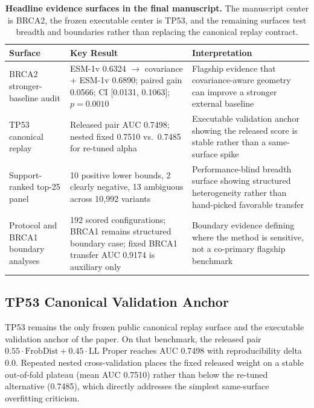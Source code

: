 \documentclass[10pt,twocolumn,letterpaper]{article}
\begin{document}
\begin{table}[t]
\centering
\caption{\textbf{Headline evidence surfaces in the final manuscript.} The manuscript
center is BRCA2, the frozen executable center is TP53, and the remaining surfaces test
breadth and boundaries rather than replacing the canonical replay contract.}
\label{tab:evidence}
\vspace{3pt}
\small
\begin{tabular}{@{}p{}p{}p{}@{}}
\toprule
\textbf{Surface} & \textbf{Key Result} & \textbf{Interpretation} \\
\midrule
BRCA2 stronger-baseline audit &
ESM-1v 0.6324 $\rightarrow$ covariance + ESM-1v 0.6890; paired gain 0.0566; CI [0.0131, 0.1063]; $p=0.0010$ &
Flagship evidence that covariance-aware geometry can improve a stronger external baseline \\
TP53 canonical replay &
Released pair AUC 0.7498; nested fixed 0.7510 vs.\ 0.7485 for re-tuned alpha &
Executable validation anchor showing the released score is stable rather than a same-surface spike \\
Support-ranked top-25 panel &
10 positive lower bounds, 2 clearly negative, 13 ambiguous across 10,992 variants &
Performance-blind breadth surface showing structured heterogeneity rather than hand-picked favorable transfer \\
Protocol and BRCA1 boundary analyses &
192 scored configurations; BRCA1 remains structured boundary case; fixed BRCA1 transfer AUC 0.9174 is auxiliary only &
Boundary evidence defining where the method is sensitive, not a co-primary flagship benchmark \\
\bottomrule
\end{tabular}
\end{table}

\subsection{TP53 Canonical Validation Anchor}

TP53 remains the only frozen public canonical replay surface and the executable
validation anchor of the paper. On that benchmark, the released pair
$0.55\cdot\text{FrobDist}+0.45\cdot\text{LL Proper}$ reaches AUC 0.7498 with
reproducibility delta 0.0. Repeated nested cross-validation places the fixed released
weight on a stable out-of-fold plateau (mean AUC 0.7510) rather than below the
re-tuned alternative (0.7485), which directly addresses the simplest same-surface
overfitting criticism.
\end{document}
